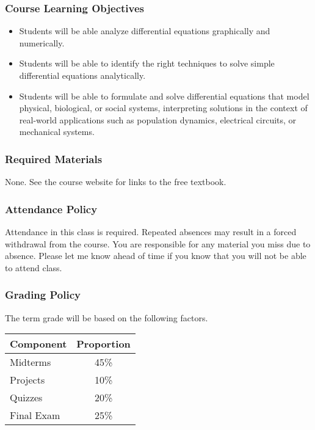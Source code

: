 \documentclass[10pt]{article}
\begin{document}
\subsubsection*{Course Learning Objectives}

\begin{itemize}

\item Students will be able analyze differential equations graphically and numerically.

\item Students will be able to identify the right techniques to solve simple differential equations analytically. 

\item Students will be able to formulate and solve differential equations that model physical, biological, or social systems, interpreting solutions in the context of real-world applications such as population dynamics, electrical circuits, or mechanical systems.

\end{itemize}

\subsubsection*{Required Materials}

None. See the course website for links to the free textbook.

%
\subsubsection*{Attendance Policy}

Attendance in this class is required. Repeated absences may result in a forced withdrawal from the course. You are responsible for any material you miss due to absence. Please let me know ahead of time if you know that you will not be able to attend class.

\subsubsection*{Grading Policy}

The term grade will be based on the following factors.

\begin{center}
\begin{tabular}{|l|c|}
\hline
Component      & Proportion \\ \hline
Midterms  & 45\% \\
Projects  & 10\% \\
Quizzes  & 20\% \\
Final Exam  & 25\% \\ \hline
\end{tabular}
\end{center}
\end{document}
